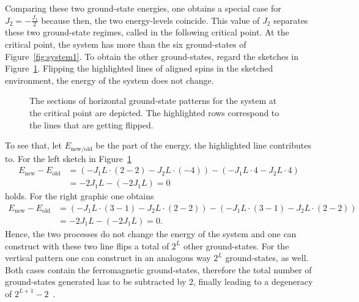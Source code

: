 Comparing these two ground-state energies, one obtains a special case for $J_2=-\!\frac{J_1}{2}$ because then, the two energy-levels 
coincide. This value of $J_2$ separates these two ground-state regimes, called in the following critical point. At the critical point, the system 
has more than the six ground-states of Figure~\ref{fig:system1}. To obtain the other ground-states, regard
the sketches in Figure~\ref{fig:system2}. Flipping the highlighted lines of aligned spins in the sketched environment, the energy of the 
system does not change.   
\begin{figure}[!h]
    \centering
        
    \caption{ 
                The sections of horizontal ground-state patterns for the system at the critical point are depicted. The highlighted rows correspond 
                to the lines that are getting flipped.  
            }
    \label{fig:system2}
\end{figure}
To see that, let $E_{\mathrm{new}/\mathrm{old}}$ be the part of the energy, the highlighted line contributes to. For the left sketch
in Figure~\ref{fig:system2} 
\begin{align*}
    E_\mathrm{new}-E_\mathrm{old}&=(-J_1L\!\cdot\!(2-2)-J_2L\!\cdot\!(-4))-(-J_1L\!\cdot\!4-J_2L\!\cdot\!4)\\
                                 &= -2J_1L-(-2J_1L)=0
\end{align*}
holds. For the right graphic one obtains
\begin{align*}
    E_\mathrm{new}-E_\mathrm{old}&=(-J_1L\!\cdot\!(3-1)-J_2L\!\cdot\!(2-2))-(-J_1L\!\cdot\!(3-1)-J_2L\!\cdot\!(2-2))\\
                                 &= -2J_1L-(-2J_1L)=0.
\end{align*}
Hence, the two processes do not change the energy of the system and one can construct with these two line flips a total of $2^L$ other
ground-states. For the vertical pattern one can construct in an analogous way $2^L$ ground-states, as well. Both cases contain the ferromagnetic 
ground-states, therefore the total number of ground-states generated has to be subtracted by $2$, finally leading to a degeneracy of 
$2^{L+1}\!-\!2$~\cite{Kalz2008}.


